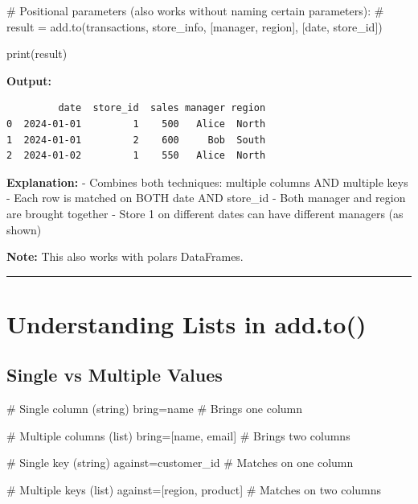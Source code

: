 \documentclass[
  letterpaper,
]{scrbook}
\newenvironment{Shaded}{\begin{snugshade}}{\end{snugshade}}
\newcommand{\BuiltInTok}[1]{\textcolor[rgb]{0.00,0.23,0.31}{#1}}
\newcommand{\CommentTok}[1]{\textcolor[rgb]{0.37,0.37,0.37}{#1}}
\newcommand{\NormalTok}[1]{\textcolor[rgb]{0.00,0.23,0.31}{#1}}
\newcommand{\OperatorTok}[1]{\textcolor[rgb]{0.37,0.37,0.37}{#1}}
\newcommand{\StringTok}[1]{\textcolor[rgb]{0.13,0.47,0.30}{#1}}
\begin{document}
\begin{Shaded}
\begin{Highlighting}[]
\CommentTok{\# Positional parameters (also works without naming certain parameters):}
\CommentTok{\# result = add.to(transactions, store\_info, [\textquotesingle{}manager\textquotesingle{}, \textquotesingle{}region\textquotesingle{}], [\textquotesingle{}date\textquotesingle{}, \textquotesingle{}store\_id\textquotesingle{}])}

\BuiltInTok{print}\NormalTok{(result)}
\end{Highlighting}
\end{Shaded}

\textbf{Output:}

\begin{verbatim}
         date  store_id  sales manager region
0  2024-01-01         1    500   Alice  North
1  2024-01-01         2    600     Bob  South
2  2024-01-02         1    550   Alice  North
\end{verbatim}

\textbf{Explanation:} - Combines both techniques: multiple columns AND
multiple keys - Each row is matched on BOTH date AND store\_id - Both
manager and region are brought together - Store 1 on different dates can
have different managers (as shown)

\textbf{Note:} This also works with polars DataFrames.

\begin{center}\rule{0.5\linewidth}{0.5pt}\end{center}

\section{Understanding Lists in
add.to()}\label{understanding-lists-in-add.to}

\subsection{Single vs Multiple Values}\label{single-vs-multiple-values}

\begin{Shaded}
\begin{Highlighting}[]
\CommentTok{\# Single column (string)}
\NormalTok{bring}\OperatorTok{=}\StringTok{\textquotesingle{}name\textquotesingle{}}              \CommentTok{\# Brings one column}

\CommentTok{\# Multiple columns (list)}
\NormalTok{bring}\OperatorTok{=}\NormalTok{[}\StringTok{\textquotesingle{}name\textquotesingle{}}\NormalTok{, }\StringTok{\textquotesingle{}email\textquotesingle{}}\NormalTok{]   }\CommentTok{\# Brings two columns}

\CommentTok{\# Single key (string)}
\NormalTok{against}\OperatorTok{=}\StringTok{\textquotesingle{}customer\_id\textquotesingle{}}     \CommentTok{\# Matches on one column}

\CommentTok{\# Multiple keys (list)}
\NormalTok{against}\OperatorTok{=}\NormalTok{[}\StringTok{\textquotesingle{}region\textquotesingle{}}\NormalTok{, }\StringTok{\textquotesingle{}product\textquotesingle{}}\NormalTok{]  }\CommentTok{\# Matches on two columns}
\end{Highlighting}
\end{Shaded}
\end{document}
